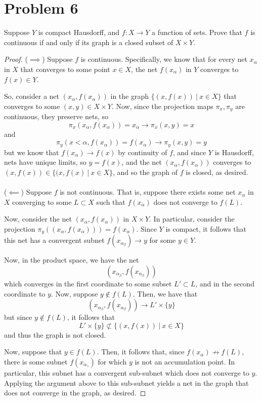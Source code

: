 \documentclass[fontsize=11pt]{scrartcl} %
\numberwithin{equation}{section} %
\numberwithin{figure}{section} %
\numberwithin{table}{section} %
\begin{document}
\section*{Problem 6}
Suppose $Y$ is compact Hausdorff, and $f:X\to Y$ a function of sets. Prove that
$f$ is continuous if and only if its graph is a closed subset of $X\times Y$.
\\
\begin{proof}
    ($\implies$)
    Suppose $f$ is continuous. Specifically, we know that for every net $x_{\alpha}$
    in $X$ that converges to some point $x\in X$, the net $f(x_{\alpha})$
    in $Y$ converges to $f(x)\in Y$.

    So, consider a net $(x_{\alpha},f(x_{\alpha}))$ in the graph $\{(x,f(x))\ |\
    x\in X\}$ that converges to some $(x,y)\in X\times Y$. Now, since the
    projection maps $\pi_x,\pi_y$ are continuous, they preserve nets, so
    \[
        \pi_x(x_{\alpha},f(x_{\alpha})) = x_{\alpha} \to \pi_x(x,y)=x
    \]
    and
    \[
        \pi_y(x<{\alpha},f(x_{\alpha})) = f(x_{\alpha}) \to \pi_y(x,y) = y
    \]
    but we know that $f(x_{\alpha})\to f(x)$ by continuity of $f$, and since $Y$
    is Hausdorff, nets have unique limits, so $y=f(x)$, and the net
    $(x_{\alpha},f(x_{\alpha}))$ converges to $(x,f(x))\in \{(x,f(x)\ |\ x\in
    X\}$, and so the graph of $f$ is closed, as desired.
    \\
    \\
    ($\impliedby$)
    Suppose $f$ is not continuous. That is, suppose there exists some net
    $x_{\alpha}$ in $X$ converging to some $L\subset X$ such that
    $f(x_{\alpha})$ does not converge to $f(L)$.

    Now, consider the net $(x_{\alpha},f(x_{\alpha}))$ in $X\times Y$. In
    particular, consider the projection $\pi_y((x_{\alpha},f(x_{\alpha}))) =
    f(x_{\alpha})$. Since $Y$ is compact, it follows that this net has a
    convergent subnet $f(x_{\alpha_{\beta}})\to y$ for some $y\in Y$.

    Now, in the product space, we have the net
    \[
        (x_{\alpha_{\beta}}, f(x_{\alpha_{\beta}}))
    \]
    which converges in the first coordinate to some subset $L'\subset L$, and in
    the second coordinate to $y$. Now, suppose $y\not\in f(L)$. Then, we have
    that
    \[
        (x_{\alpha_{\beta}}, f(x_{\alpha_{\beta}}))\to L'\times \{y\}
    \]
    but since $y\not\in f(L)$, it follows that
    \[
        L'\times \{y\}\not\subset \{(x,f(x))\ |\ x\in X\}
    \]
    and thus the graph is not closed.

    Now, suppose that $y\in f(L)$. Then, it follows that, since
    $f(x_{\alpha})\not\to f(L)$, there is some subnet $f(x_{\alpha_{\gamma}})$
    for which $y$ is not an accumulation point. In particular, this subnet has a
    convergent sub-subnet which does not converge to $y$. Applying the argument
    above to this sub-subnet yields a net in the graph that does not converge in
    the graph, as desired.
\end{proof}
\end{document}
